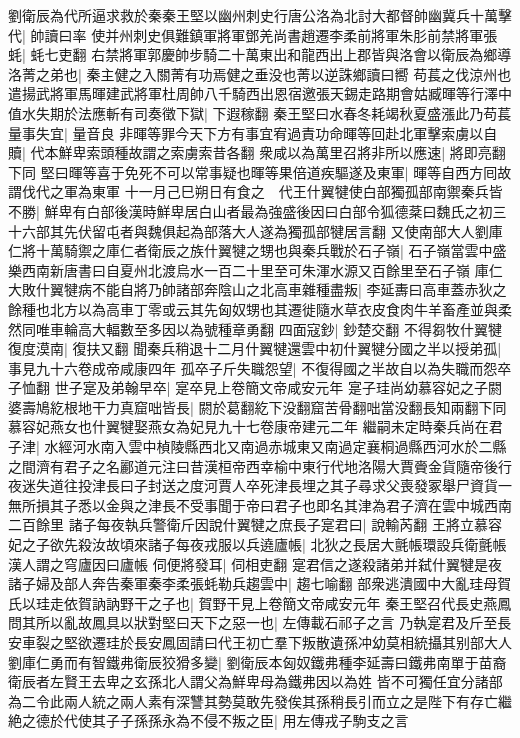 劉衛辰為代所逼求救於秦秦王堅以幽州刺史行唐公洛為北討大都督帥幽冀兵十萬擊代|{
	帥讀曰率}
使并州刺史俱難鎮軍將軍鄧羌尚書趙遷李柔前將軍朱肜前禁將軍張蚝|{
	蚝七吏翻}
右禁將軍郭慶帥步騎二十萬東出和龍西出上郡皆與洛會以衛辰為鄉導洛菁之弟也|{
	秦主健之入關菁有功焉健之垂没也菁以逆誅鄉讀曰嚮}
苟萇之伐涼州也遣揚武將軍馬暉建武將軍杜周帥八千騎西出恩宿邀張天錫走路期會姑臧暉等行澤中值水失期於法應斬有司奏徵下獄|{
	下遐稼翻}
秦王堅曰水春冬耗竭秋夏盛漲此乃苟萇量事失宜|{
	量音良}
非暉等罪今天下方有事宜宥過責功命暉等回赴北軍擊索虜以自贖|{
	代本鮮卑索頭種故謂之索虜索昔各翻}
衆咸以為萬里召將非所以應速|{
	將即亮翻下同}
堅曰暉等喜于免死不可以常事疑也暉等果倍道疾驅遂及東軍|{
	暉等自西方囘故謂伐代之軍為東軍}
十一月己巳朔日有食之　代王什翼犍使白部獨孤部南禦秦兵皆不勝|{
	鮮卑有白部後漢時鮮卑居白山者最為強盛後因曰白部令狐德棻曰魏氏之初三十六部其先伏留屯者與魏俱起為部落大人遂為獨孤部犍居言翻}
又使南部大人劉庫仁將十萬騎禦之庫仁者衛辰之族什翼犍之甥也與秦兵戰於石子嶺|{
	石子嶺當雲中盛樂西南新唐書曰自夏州北渡烏水一百二十里至可朱渾水源又百餘里至石子嶺}
庫仁大敗什翼犍病不能自將乃帥諸部奔陰山之北高車雜種盡叛|{
	李延夀曰高車蓋赤狄之餘種也北方以為高車丁零或云其先匈奴甥也其遷徙隨水草衣皮食肉牛羊畜產並與柔然同唯車輪高大輻數至多因以為號種章勇翻}
四面寇鈔|{
	鈔楚交翻}
不得芻牧什翼犍復度漠南|{
	復扶又翻}
聞秦兵稍退十二月什翼犍還雲中初什翼犍分國之半以授弟孤|{
	事見九十六卷成帝咸康四年}
孤卒子斤失職怨望|{
	不復得國之半故自以為失職而怨卒子恤翻}
世子寔及弟翰早卒|{
	寔卒見上卷簡文帝咸安元年}
寔子珪尚幼慕容妃之子閼婆壽鳩紇根地干力真窟咄皆長|{
	閼於葛翻紇下没翻窟苦骨翻咄當没翻長知兩翻下同慕容妃燕女也什翼犍娶燕女為妃見九十七卷康帝建元二年}
繼嗣未定時秦兵尚在君子津|{
	水經河水南入雲中楨陵縣西北又南過赤城東又南過定襄桐過縣西河水於二縣之間濟有君子之名酈道元注曰昔漢桓帝西幸榆中東行代地洛陽大賈賫金貨隨帝後行夜迷失道往投津長曰子封送之度河賈人卒死津長埋之其子尋求父喪發冢舉尸資貨一無所損其子悉以金與之津長不受事聞于帝曰君子也即名其津為君子濟在雲中城西南二百餘里}
諸子每夜執兵警衛斤因說什翼犍之庶長子寔君曰|{
	說輸芮翻}
王將立慕容妃之子欲先殺汝故頃來諸子每夜戎服以兵遶廬帳|{
	北狄之長居大氈帳環設兵衛氈帳漢人謂之穹廬因曰廬帳}
伺便將發耳|{
	伺相吏翻}
寔君信之遂殺諸弟并弑什翼犍是夜諸子婦及部人奔告秦軍秦李柔張蚝勒兵趨雲中|{
	趨七喻翻}
部衆逃潰國中大亂珪母賀氏以珪走依賀訥訥野干之子也|{
	賀野干見上卷簡文帝咸安元年}
秦王堅召代長史燕鳳問其所以亂故鳳具以狀對堅曰天下之惡一也|{
	左傳載石祁子之言}
乃執寔君及斤至長安車裂之堅欲遷珪於長安鳳固請曰代王初亡羣下叛散遺孫冲幼莫相統攝其别部大人劉庫仁勇而有智鐵弗衛辰狡猾多變|{
	劉衛辰本匈奴鐵弗種李延壽曰鐵弗南單于苗裔衛辰者左賢王去卑之玄孫北人謂父為鮮卑母為鐵弗因以為姓}
皆不可獨任宜分諸部為二令此兩人統之兩人素有深讐其勢莫敢先發俟其孫稍長引而立之是陛下有存亡繼絶之德於代使其子子孫孫永為不侵不叛之臣|{
	用左傳戎子駒支之言}
